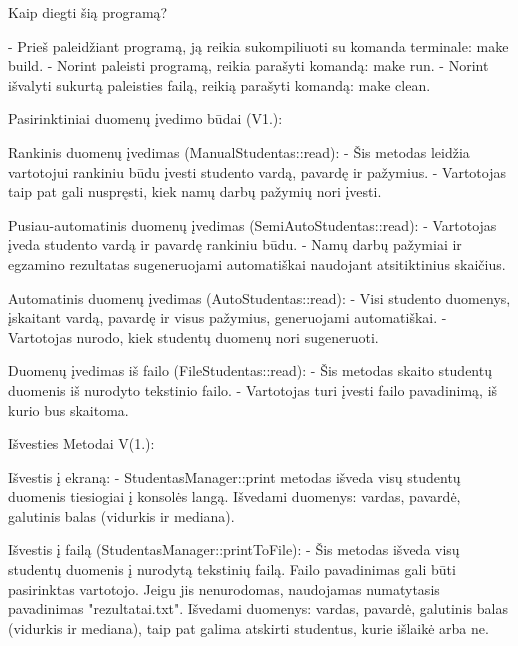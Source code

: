 Kaip diegti šią programą? \begin{DoxyVerb}- Prieš paleidžiant programą, ją reikia sukompiliuoti su komanda terminale: make build.
- Norint paleisti programą, reikia parašyti komandą: make run.
- Norint išvalyti sukurtą paleisties failą, reikią parašyti komandą: make clean.
\end{DoxyVerb}


Pasirinktiniai duomenų įvedimo būdai (V1.)\+: \begin{DoxyVerb}Rankinis duomenų įvedimas (ManualStudentas::read):
    - Šis metodas leidžia vartotojui rankiniu būdu įvesti studento vardą, pavardę ir pažymius.
    - Vartotojas taip pat gali nuspręsti, kiek namų darbų pažymių nori įvesti.

Pusiau-automatinis duomenų įvedimas (SemiAutoStudentas::read):
    - Vartotojas įveda studento vardą ir pavardę rankiniu būdu.
    - Namų darbų pažymiai ir egzamino rezultatas sugeneruojami automatiškai naudojant atsitiktinius skaičius.

Automatinis duomenų įvedimas (AutoStudentas::read):
    - Visi studento duomenys, įskaitant vardą, pavardę ir visus pažymius, generuojami automatiškai.
    - Vartotojas nurodo, kiek studentų duomenų nori sugeneruoti.

Duomenų įvedimas iš failo (FileStudentas::read):
    - Šis metodas skaito studentų duomenis iš nurodyto tekstinio failo.
    - Vartotojas turi įvesti failo pavadinimą, iš kurio bus skaitoma.
\end{DoxyVerb}
 Išvesties Metodai V(1.)\+: \begin{DoxyVerb}Išvestis į ekraną:
    - StudentasManager::print metodas išveda visų studentų duomenis tiesiogiai į konsolės langą.
        Išvedami duomenys: vardas, pavardė, galutinis balas (vidurkis ir mediana).

Išvestis į failą (StudentasManager::printToFile):
    - Šis metodas išveda visų studentų duomenis į nurodytą tekstinių failą.
        Failo pavadinimas gali būti pasirinktas vartotojo. Jeigu jis nenurodomas, naudojamas numatytasis pavadinimas "rezultatai.txt".
        Išvedami duomenys: vardas, pavardė, galutinis balas (vidurkis ir mediana), taip pat galima atskirti studentus, kurie išlaikė arba ne.
\end{DoxyVerb}


